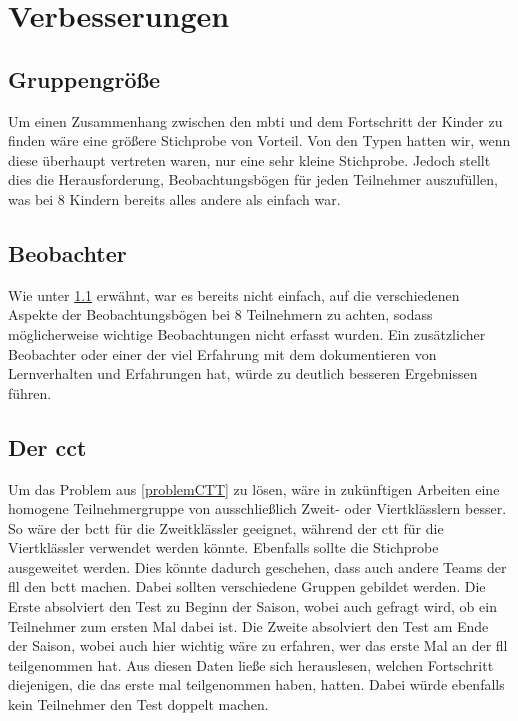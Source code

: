  

\section{Verbesserungen}
\subsection{Gruppengröße}\label{size}
Um einen Zusammenhang zwischen den \acrlong{mbti} und dem Fortschritt der Kinder zu finden wäre eine größere Stichprobe von Vorteil. Von den Typen hatten wir, wenn diese überhaupt vertreten waren, nur eine sehr kleine Stichprobe. Jedoch stellt dies die Herausforderung, Beobachtungsbögen für jeden Teilnehmer auszufüllen, was bei 8 Kindern bereits alles andere als einfach war.

\subsection{Beobachter}
Wie unter \ref{size} erwähnt, war es bereits nicht einfach, auf die verschiedenen Aspekte der Beobachtungsbögen bei 8 Teilnehmern zu achten, sodass möglicherweise wichtige Beobachtungen nicht erfasst wurden. Ein zusätzlicher Beobachter oder einer der viel Erfahrung mit dem dokumentieren von Lernverhalten und Erfahrungen hat, würde zu deutlich besseren Ergebnissen führen.

\subsection{Der \acrlong{cct}}
Um das Problem aus \ref{problemCTT} zu lösen, wäre in zukünftigen Arbeiten eine homogene Teilnehmergruppe von ausschließlich Zweit- oder Viertklässlern besser.\\
So wäre der \acrshort{bctt} für die Zweitklässler geeignet, während der \acrshort{ctt} für die Viertklässler verwendet werden könnte.
Ebenfalls sollte die Stichprobe ausgeweitet werden. Dies könnte dadurch geschehen, dass auch andere Teams der \acrshort{fll} den \acrshort{bctt} machen. Dabei sollten verschiedene Gruppen gebildet werden. Die Erste absolviert den Test zu Beginn der Saison, wobei auch gefragt wird, ob ein Teilnehmer zum ersten Mal dabei ist. Die Zweite absolviert den Test am Ende der Saison, wobei auch hier wichtig wäre zu erfahren, wer das erste Mal an der \acrshort{fll} teilgenommen hat. Aus diesen Daten ließe sich herauslesen, welchen Fortschritt diejenigen, die das erste mal teilgenommen haben, hatten. Dabei würde ebenfalls kein Teilnehmer den Test doppelt machen.



